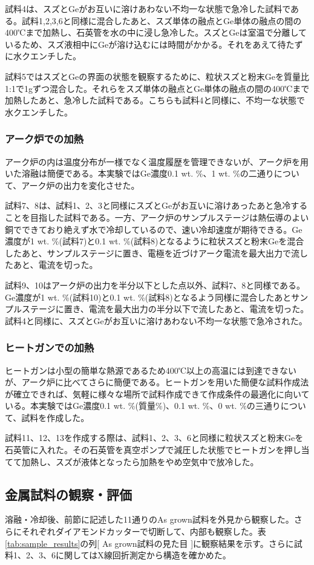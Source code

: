 試料4は、スズとGeがお互いに溶けあわない不均一な状態で急冷した試料である。試料1,2,3,6と同様に混合したあと、スズ単体の融点とGe単体の融点の間の400℃まで加熱し、石英管を水の中に浸し急冷した。スズとGeは室温で分離しているため、スズ液相中にGeが溶け込むには時間がかかる。それをあえて待たずに水クエンチした。

試料5ではスズとGeの界面の状態を観察するために、粒状スズと粉末Geを質量比1:1で1gずつ混合した。それらをスズ単体の融点とGe単体の融点の間の400℃まで加熱したあと、急冷した試料である。こちらも試料4と同様に、不均一な状態で水クエンチした。

\subsubsection{アーク炉での加熱}
アーク炉の内は温度分布が一様でなく温度履歴を管理できないが、アーク炉を用いた溶融は簡便である。本実験ではGe濃度0.1 wt. \%、1 wt. \%の二通りについて、アーク炉の出力を変化させた。

試料7、8は、試料1、2、3と同様にスズとGeがお互いに溶けあったあと急冷することを目指した試料である。一方、アーク炉のサンプルステージは熱伝導のよい銅でできており絶えず水で冷却しているので、速い冷却速度が期待できる。Ge濃度が1 wt. \%(試料7)と0.1 wt. \%(試料8)となるように粒状スズと粉末Geを混合したあと、サンプルステージに置き、電極を近づけアーク電流を最大出力で流したあと、電流を切った。

試料9、10はアーク炉の出力を半分以下とした点以外、試料7、8と同様である。Ge濃度が1 wt. \%(試料10)と0.1 wt. \%(試料8)となるよう同様に混合したあとサンプルステージに置き、電流を最大出力の半分以下で流したあと、電流を切った。試料4と同様に、スズとGeがお互いに溶けあわない不均一な状態で急冷された。

\subsubsection{ヒートガンでの加熱}
ヒートガンは小型の簡単な熱源であるため400℃以上の高温には到達できないが、アーク炉に比べてさらに簡便である。ヒートガンを用いた簡便な試料作成法が確立できれば、気軽に様々な場所で試料作成できて作成条件の最適化に向いている。本実験ではGe濃度0.1 wt. \%(質量\%)、0.1 wt. \%、0 wt. \%の三通りについて、試料を作成した。

試料11、12、13を作成する際は、試料1、2、3、6と同様に粒状スズと粉末Geを石英管に入れた。その石英管を真空ポンプで減圧した状態でヒートガンを押し当てて加熱し、スズが液体となったら加熱をやめ空気中で放冷した。

\subsection{金属試料の観察・評価}
溶融・冷却後、前節に記述した11通りのAs grown試料を外見から観察した。さらにそれぞれダイアモンドカッターで切断して、内部も観察した。表\ref{tab:sample_results}の列[ As grown試料の見た目 ]に観察結果を示す。さらに試料1、2、3、6に関してはX線回折測定から構造を確かめた。

